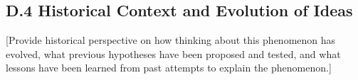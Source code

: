 \documentclass[11pt,letterpaper]{article}
\begin{document}
\subsection*{D.4 Historical Context and Evolution of Ideas}

[Provide historical perspective on how thinking about this phenomenon has evolved, what previous hypotheses have been proposed and tested, and what lessons have been learned from past attempts to explain the phenomenon.]

\newpage



% 
% 
%
%
\end{document}
